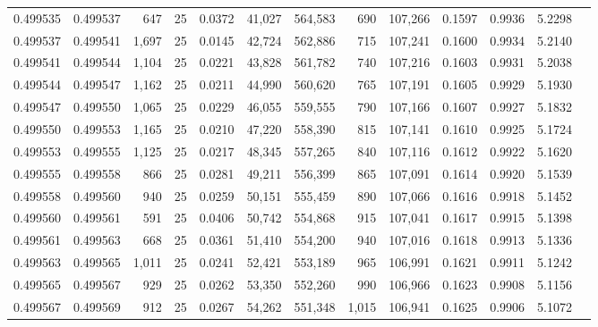 \begin{tabular}{rrrrrrrrrrrrr}
0.499535 & 0.499537 &   647 &  25 &                                     0.0372 &  41,027 & 564,583 &     690 & 107,266 & 0.1597 & 0.9936 & 5.2298 \\
0.499537 & 0.499541 & 1,697 &  25 &                                     0.0145 &  42,724 & 562,886 &     715 & 107,241 & 0.1600 & 0.9934 & 5.2140 \\
0.499541 & 0.499544 & 1,104 &  25 &                                     0.0221 &  43,828 & 561,782 &     740 & 107,216 & 0.1603 & 0.9931 & 5.2038 \\
0.499544 & 0.499547 & 1,162 &  25 &                                     0.0211 &  44,990 & 560,620 &     765 & 107,191 & 0.1605 & 0.9929 & 5.1930 \\
0.499547 & 0.499550 & 1,065 &  25 &                                     0.0229 &  46,055 & 559,555 &     790 & 107,166 & 0.1607 & 0.9927 & 5.1832 \\
0.499550 & 0.499553 & 1,165 &  25 &                                     0.0210 &  47,220 & 558,390 &     815 & 107,141 & 0.1610 & 0.9925 & 5.1724 \\
0.499553 & 0.499555 & 1,125 &  25 &                                     0.0217 &  48,345 & 557,265 &     840 & 107,116 & 0.1612 & 0.9922 & 5.1620 \\
0.499555 & 0.499558 &   866 &  25 &                                     0.0281 &  49,211 & 556,399 &     865 & 107,091 & 0.1614 & 0.9920 & 5.1539 \\
0.499558 & 0.499560 &   940 &  25 &                                     0.0259 &  50,151 & 555,459 &     890 & 107,066 & 0.1616 & 0.9918 & 5.1452 \\
0.499560 & 0.499561 &   591 &  25 &                                     0.0406 &  50,742 & 554,868 &     915 & 107,041 & 0.1617 & 0.9915 & 5.1398 \\
0.499561 & 0.499563 &   668 &  25 &                                     0.0361 &  51,410 & 554,200 &     940 & 107,016 & 0.1618 & 0.9913 & 5.1336 \\
0.499563 & 0.499565 & 1,011 &  25 &                                     0.0241 &  52,421 & 553,189 &     965 & 106,991 & 0.1621 & 0.9911 & 5.1242 \\
0.499565 & 0.499567 &   929 &  25 &                                     0.0262 &  53,350 & 552,260 &     990 & 106,966 & 0.1623 & 0.9908 & 5.1156 \\
0.499567 & 0.499569 &   912 &  25 &                                     0.0267 &  54,262 & 551,348 &   1,015 & 106,941 & 0.1625 & 0.9906 & 5.1072 \\

\end{tabular}

